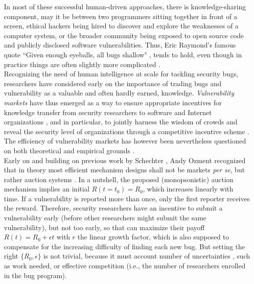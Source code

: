 In most of these successful human-driven approaches, there is knowledge-sharing component, may it be between two programmers sitting together in front of a screen, ethical hackers being hired to discover and explore the weaknesses of a computer system, or the broader community being exposed to open source code and publicly disclosed software vulnerabilities. Thus, Eric Raymond's famous quote ``Given enough eyeballs, all bugs shallow" \cite{raymond1999cathedral}, tends to hold, even though in practice things are often slightly more complicated \cite{hafiz2015game}.\\

Recognizing the need of human intelligence at scale for tackling security bugs, researchers have considered early on the importance of trading bugs and vulnerability as a valuable and often hardly earned, knowledge. {\it Vulnerability markets} have thus emerged as a way to ensure appropriate incentives for knowledge transfer from security researchers to software and Internet organizations \cite{camp2004pricing}, and in particular, to jointly harness the wisdom of crowds and reveal the security level of organizations through a competitive incentive scheme \cite{schechter2002buy}. The efficiency of vulnerability markets has however been nevertheless questioned on both theoretical \cite{kannan2005market,mckinney2007vulnerability} and empirical grounds \cite{ransbotham2008markets,algarni2014software}.\\

Early on and building on previous work by Schechter \cite{schechter2002buy}, Andy Ozment \cite{ozment2004bug} recognized that in theory most efficient mechanism designs shall not be markets {\it per se}, but rather auction systems \cite{milgrom1982theory}. In a nutshell, the proposed (monopsonistic) auction mechanism implies an initial $R(t=t_0) = R_0$, which increases linearly with time.  If a vulnerability is reported more than once, only the first reporter receives the reward. Therefore, security researchers have an incentive to submit a vulnerability early (before other researchers might submit the same vulnerability), but not too early, so that can maximize their payoff $R(t) = R_0 + \epsilon t$ with $r$ the linear growth factor, which is also supposed to compensate for the increasing difficulty of finding each new bug. But setting the right $\{R_0,\epsilon \}$ is not trivial, because it must account number of uncertainties \cite{pandey2014assessment}, such as work needed, or effective competition (i.e., the number of researchers enrolled in the bug program).\\

